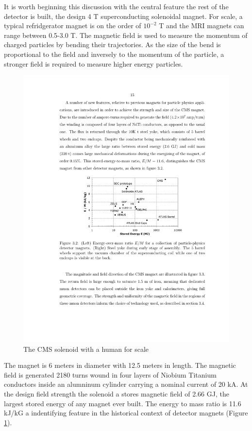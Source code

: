 It is worth beginning this discussion with the central feature the rest of the detector is built, the 
design 4 T  superconducting solenoidal magnet. For scale, a typical refridgerator magnet is on the 
order of $10^{-2}$ T and the MRI magnets can range between 0.5-3.0 T. The magnetic field is used
to measure the momentum of charged particles by bending their trajectories. As the size of the bend is
proportional to the field and inversely to the momentum of the particle, a stronger field is required 
to measure higher energy particles. 

\begin{figure}
\begin{center}
\includegraphics[width=.75\textwidth]{pics/CMS_EoverM}
\end{center}
\caption{The CMS solenoid with a human for scale}
\label{fig:eoverm}
\end{figure}

The magnet is 6 meters in diameter with 12.5 meters in length. The magnetic field is generated 2180 turns 
wound in four layers of Niobium Titanium conductors inside an alumninum cylinder carrying a
 nominal current of 20 kA.  At the design field strength the solenoid a stores magnetic field of 
2.66 GJ, the largest stored energy of any magnet ever built. The energy to mass ratio is 11.6 kJ/kG a indentifying 
feature in the historical context of detector magnets (Figure \ref{fig:eoverm}).    

